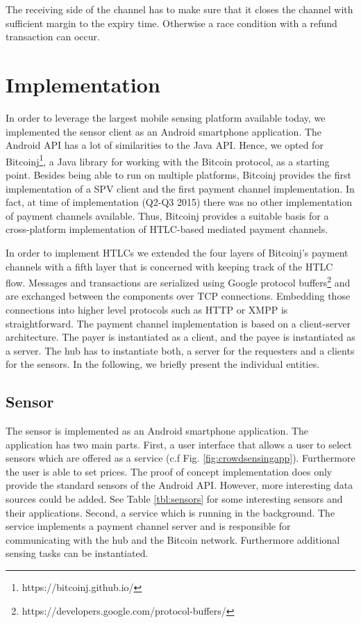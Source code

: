  The receiving side of the channel has to make sure that it closes the channel with sufficient margin to the expiry time. Otherwise a race condition with a refund transaction can occur.

\section{Implementation}
\label{sec:trust-lessimplementation}

In order to leverage the largest mobile sensing platform available today, we implemented the sensor client as an Android smartphone application. The Android \ac{API} has a lot of similarities to the Java \ac{API}. Hence, we opted for Bitcoinj\footnote{https://bitcoinj.github.io/}, a Java library for working with the Bitcoin protocol,  as a starting point. Besides being able to run on multiple platforms, Bitcoinj provides the first implementation of a \ac{SPV} client and the first payment channel implementation. In fact, at time of implementation (Q2-Q3 2015) there was no other implementation of payment channels available. Thus, Bitcoinj provides a suitable basis for a cross-platform implementation of \ac{HTLC}-based mediated payment channels.

In order to implement \ac{HTLC}s we extended the four layers of Bitcoinj's payment channels with a fifth layer that is concerned with keeping track of the \ac{HTLC} flow.
Messages and transactions are serialized using Google protocol buffers\footnote{https://developers.google.com/protocol-buffers/} and are exchanged between the components over \ac{TCP} connections. Embedding those connections into higher level protocols such as \ac{HTTP} or \ac{XMPP} is straightforward.
The payment channel implementation is based on a client-server architecture. The payer is instantiated as a client, and the payee is instantiated as a server. The hub has to instantiate both, a server for the requesters and a clients for the sensors. In the following, we briefly present the individual entities. 

\subsection{Sensor}
The sensor is implemented as an Android smartphone application. The application has two main parts. First, a user interface that allows a user to select sensors which are offered as a service (c.f Fig. \ref{fig:crowdsensingapp}). Furthermore the user is able to set prices. The proof of concept implementation does only provide the standard sensors of the Android API. However, more interesting data sources could be added. See Table \ref{tbl:sensors} for some interesting sensors and their applications. Second, a service which is running in the background. The service implements a payment channel server and is responsible for communicating with the hub and the Bitcoin network. Furthermore additional sensing tasks can be instantiated.


